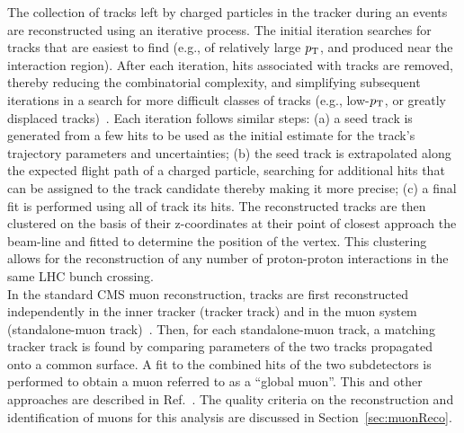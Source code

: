 

\indent The collection of tracks left by charged particles in the tracker during an events are 
reconstructed using an iterative process. The initial iteration searches for tracks 
that are easiest to find (e.g., of relatively large $p_{\mathrm{T}}$, and produced near the 
interaction region). After each iteration, hits associated with tracks are removed, 
thereby reducing the combinatorial complexity, and simplifying subsequent iterations 
in a search for more difficult classes of tracks (e.g., low-$p_{\mathrm{T}}$, or greatly displaced
tracks)~\cite{Chatrchyan:2014fea}. Each iteration follows similar steps: (a) a seed 
track is generated from a few hits to be used as the initial estimate for the track's 
trajectory parameters and uncertainties; (b) the seed track is extrapolated along the 
expected flight path of a charged particle, searching for additional hits that can be 
assigned to the track candidate thereby making it more precise; (c) a final fit is performed 
using all of track its hits. The reconstructed tracks are then clustered on the basis of 
their z-coordinates at their point of closest approach the beam-line and fitted to determine 
the position of the vertex. This clustering allows for the reconstruction of any number 
of proton-proton interactions in the same LHC bunch crossing.\\
\indent In the standard CMS muon reconstruction, tracks are first reconstructed independently 
in the inner tracker (tracker track) and in the muon system (standalone-muon 
track)~\cite{1748-0221-7-10-P10002}. Then, for each standalone-muon track, a matching tracker 
track is found by comparing parameters of the two tracks propagated onto a common surface. A 
fit to the combined hits of the two subdetectors is performed to obtain a muon referred to as 
a ``global muon''. This and other approaches are described in Ref.~\cite{PAS-MUO-10-002}. The 
quality criteria on the reconstruction and identification of muons for this analysis are 
discussed in Section~\ref{sec:muonReco}. \\
